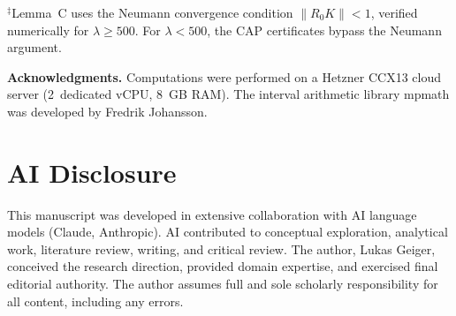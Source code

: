 \documentclass[12pt,a4paper]{article}
\theoremstyle{definition}
\theoremstyle{remark}
\begin{document}
\noindent${}^\ddagger$Lemma~C uses the Neumann convergence condition $\|R_0 K\| < 1$, verified numerically for $\lambda \geq 500$. For $\lambda < 500$, the CAP certificates bypass the Neumann argument.

\bigskip
\noindent\textbf{Acknowledgments.} Computations were performed on a Hetzner CCX13 cloud server (2~dedicated vCPU, 8~GB RAM). The interval arithmetic library mpmath was developed by Fredrik Johansson.


\section*{AI Disclosure}

This manuscript was developed in extensive collaboration with AI language models (Claude, Anthropic). AI contributed to conceptual exploration, analytical work, literature review, writing, and critical review. The author, Lukas Geiger, conceived the research direction, provided domain expertise, and exercised final editorial authority. The author assumes full and sole scholarly responsibility for all content, including any errors.
\end{document}
